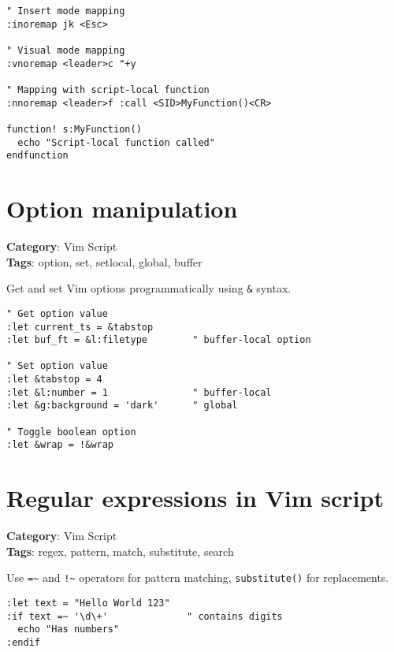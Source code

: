 {{{{{{{{{{{{{{{{{{{\begin{Exa*}{}
\begin{Verbatim}[fontsize=\footnotesize, breaklines, breakanywhere]
" Insert mode mapping
:inoremap jk <Esc>

" Visual mode mapping
:vnoremap <leader>c "+y

" Mapping with script-local function
:nnoremap <leader>f :call <SID>MyFunction()<CR>

function! s:MyFunction()
  echo "Script-local function called"
endfunction
\end{Verbatim}
\end{Exa*}

\section{Option manipulation}

\textbf{Category}: Vim Script\\ \textbf{Tags}: option, set, setlocal, global, buffer
\vspace{0.5cm}

Get and set Vim options programmatically using {\footnotesize \Verb§&§} syntax.

\begin{Exa*}{}
\begin{Verbatim}[fontsize=\footnotesize, breaklines, breakanywhere]
" Get option value
:let current_ts = &tabstop
:let buf_ft = &l:filetype        " buffer-local option

" Set option value
:let &tabstop = 4
:let &l:number = 1               " buffer-local
:let &g:background = 'dark'      " global

" Toggle boolean option
:let &wrap = !&wrap
\end{Verbatim}
\end{Exa*}

\section{Regular expressions in Vim script}

\textbf{Category}: Vim Script\\ \textbf{Tags}: regex, pattern, match, substitute, search
\vspace{0.5cm}

Use {\footnotesize \Verb§=~§} and {\footnotesize \Verb§!~§} operators for pattern matching, {\footnotesize \Verb§substitute()§} for replacements.

\begin{Exa*}{}
\begin{Verbatim}[fontsize=\footnotesize, breaklines, breakanywhere]
:let text = "Hello World 123"
:if text =~ '\d\+'              " contains digits
  echo "Has numbers"
:endif


\end{Verbatim}
\end{Exa*}}}}}}}}}}}}}}}}}}}}
